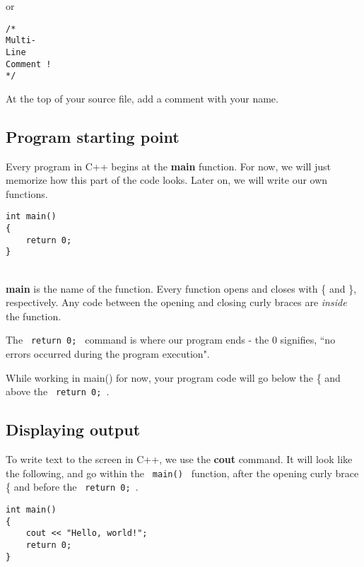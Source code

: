 \documentclass[a4paper,12pt]{book}
\begin{document}
or

\begin{lstlisting}[style=code]
/*
Multi-
Line
Comment !
*/
\end{lstlisting}

                At the top of your source file, add a comment
                with your name.

            \newpage
            \subsection*{ Program starting point }

                Every program in C++ begins at the \textbf{ main } function.
                For now, we will just memorize how this part of the code looks.
                Later on, we will write our own functions. \\
                
\begin{lstlisting}[style=code]
int main()
{
    return 0;
}
\end{lstlisting}

                ~\\
                \textbf{ main } is the name of the function. Every function
                opens and closes with \{ and \}, respectively. Any code
                between the opening and closing curly braces are
                \textit{ inside } the function.

                The \texttt{ return 0; } command is where our program ends -
                the 0 signifies, ``no errors occurred during the program execution".

                While working in main() for now, your program code will go
                below the \{ and above the \texttt{ return 0; }.

            \subsection*{ Displaying output }

                To write text to the screen in C++, we use the \textbf{ cout } command.
                It will look like the following, and go within the \texttt{ main() }
                function, after the opening curly brace \{ and before the
                \texttt{ return 0; }. ~\\

\begin{lstlisting}[style=code]
int main()
{
    cout << "Hello, world!";
    return 0;
}
\end{lstlisting}
\end{document}
